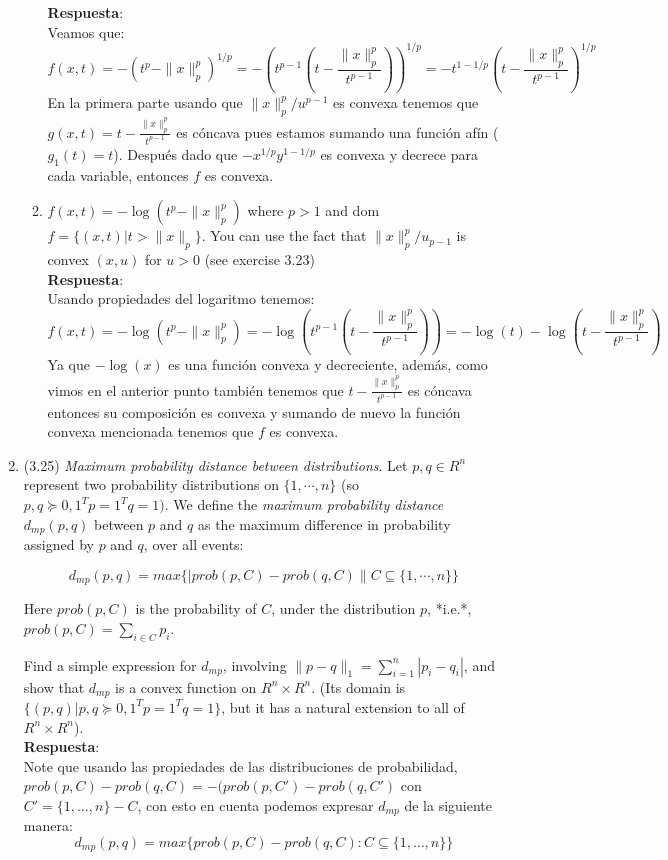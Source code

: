 \documentclass[12pt, oneside]{article}%
\begin{document}
\begin{enumerate}
\begin{enumerate}
    \textbf{Respuesta}: \\
    Veamos que:
    $$f(x,t) =-(t^p - \|x\|_p^p)^{1/p}=-\left(t^{p-1}\left(t-\frac{\|x\|_p^p}{t^{p-1}}\right)\right)^{1/p}=-t^{1-1/p}\left(t-\frac{\|x\|^p_p}{t^{p-1}}\right)^{1/p}$$
    En la primera parte usando que $\|x\|_p^p /u^{p-1}$ es convexa tenemos que $g(x,t)=t-\frac{\|x\|_p^p}{t^{p-1}}$ es cóncava pues estamos sumando una función afín
    ($g_1(t)=t$). Después dado que $-x^{1/p}y^{1-1/p}$ es convexa y decrece para cada variable, entonces $f$ es convexa.
    \item $f(x,t) = -\log(t^p - \|x\|_p^p)$ where $p>1$ and dom $f = \{(x,t) | t > \|x\|_p\}$. You can use the fact that $\|x\|_p^p/u_{p-1}$ is convex $(x,u)$ for $u>0$ (see exercise 3.23) \\
    \textbf{Respuesta}: \\
    Usando propiedades del logaritmo tenemos:
    $$f(x,t) = -\log(t^p - \|x\|_p^p)=-\log\left(t^{p-1}\left(t-\frac{\|x\|_p^p}{t^{p-1}}\right)\right)=-\log(t)-\log\left(t-\frac{\|x\|_p^p}{t^{p-1}}\right)$$
    Ya que $-\log(x)$ es una función convexa y decreciente, además, como vimos en el anterior punto también tenemos que $t-\frac{\|x\|_p^p}{t^{p-1}}$ es cóncava entonces su composición es convexa y sumando de nuevo la función convexa mencionada tenemos que $f$ es convexa.
\end{enumerate}    
\item (3.25) \textit{Maximum probability distance between distributions}. Let $p, q \in R^n$ represent two probability distributions on $\{1,\cdots,n\}$ (so $p,q \succeq 0, 1^Tp = 1^Tq = 1)$. We define the \textit{maximum probability distance} $d_{mp}(p,q)$ between $p$ and $q$ as the maximum difference in probability assigned by $p$ and $q$, over all events: 


$$ d_{mp}(p,q) = max\{|prob(p,C) - prob(q,C)\| C \subseteq \{1,\cdots,n\}\}$$

Here $prob(p,C)$ is the probability of $C$, under the distribution $p$, *i.e.*, $prob(p,C) = \sum_{i\in C}p_i$.

Find a simple expression for $d_{mp}$, involving $\|p-q\|_1 = \sum_{i=1}^n|p_i - q_i|$, and show that $d_{mp}$ is a convex function on $R^n \times R^n$. (Its domain is $\{(p,q) | p,q \succeq 0, 1^Tp = 1^Tq = 1\}$, but it has a natural extension to all of $R^n \times R^n$).\\
\textbf{Respuesta}: \\
Note que usando las propiedades de las distribuciones de probabilidad, $prob(p,C) - prob(q,C) = -(prob(p,C') - prob(q,C')$ con $C' = \{1,\dots, n\} - C$, con esto en cuenta podemos expresar $d_{mp}$ de la siguiente manera:
$$d_{mp}(p,q) = max\{prob(p,C) -prob(q,C):C \subseteq \{1,\dots, n\}\}$$


\end{enumerate}
\end{document}
